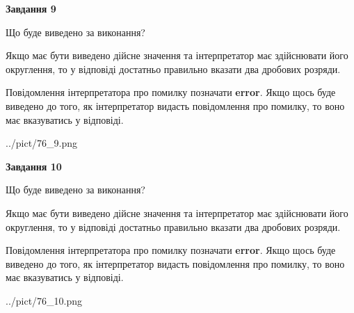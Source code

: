 \documentclass[12pt, ukrainian]{article}
\begin{document}
{\begin {Large}
{\begin {center}\textbf{Завдання 9}\end {center}}\par
Що буде виведено за виконання? \par

Якщо має бути виведено дійсне значення та інтерпретатор має здійснювати його округлення, 
то у відповіді достатньо правильно вказати два дробових розряди.

Повідомлення інтерпретатора про помилку позначати \textbf{error}.
Якщо щось буде виведено до того, як інтерпретатор видасть повідомлення про помилку, 
то воно має вказуватись у відповіді. \par

\begin{center}
	{../pict/76_9.png}
\end{center}
\newpage

{\begin {center}\textbf{Завдання 10}\end {center}}\par
Що буде виведено за виконання? \par

Якщо має бути виведено дійсне значення та інтерпретатор має здійснювати його округлення, 
то у відповіді достатньо правильно вказати два дробових розряди.

Повідомлення інтерпретатора про помилку позначати \textbf{error}.
Якщо щось буде виведено до того, як інтерпретатор видасть повідомлення про помилку, 
то воно має вказуватись у відповіді. \par

\begin{center}
	{../pict/76_10.png}
\end{center}
\newpage

\end {Large}}
\end{document}
